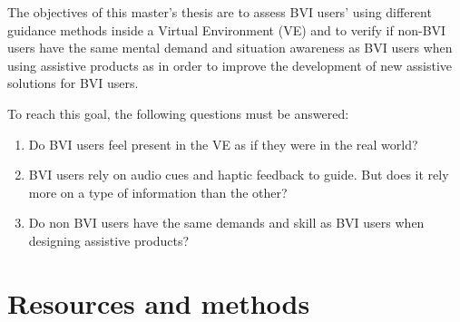 
The objectives of this master's thesis are to assess BVI users' using different guidance methods inside a Virtual Environment (VE) and to verify if non-BVI users have the same mental demand and situation awareness as BVI users when using assistive products as in order to improve the development of new assistive solutions for BVI users.


To reach this goal, the following questions must be answered:
\begin{enumerate}
    \item Do BVI users feel present in the VE as if they were in the real world? \label{itm:obj_first}
    \item BVI users rely on audio cues and haptic feedback to guide. But does it rely more on a type of information than the other? \label{itm:obj_second}
    \item Do non BVI users have the same demands and skill as BVI users when designing assistive products? \label{itm:obj_third}
\end{enumerate}





\section{Resources and methods} 


